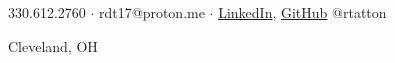 \Huge{\centerline{}}
\large{\centerline{330.612.2760 $\cdot$ rdt17@proton.me $\cdot$ \href{https://linkedin.com/in/rtatton/}{LinkedIn}, \href{https://github.com/rtatton}{GitHub} @rtatton}}
\large{\centerline{Cleveland, OH}}